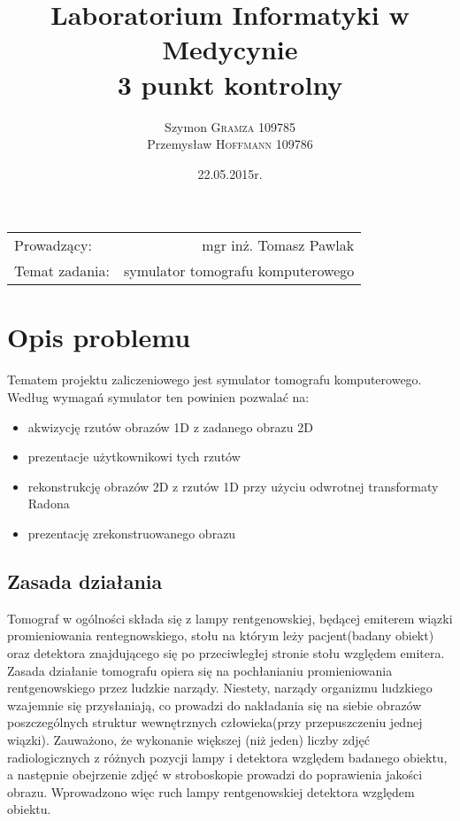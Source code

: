 \documentclass[A_4paper,12pt]{article}
\title{Laboratorium Informatyki w Medycynie \\ 3 punkt kontrolny} %
\author{Szymon \textsc{Gramza} 109785  \\ Przemysław \textsc{Hoffmann} 109786} %
\date{22.05.2015r.} %
\begin{document}
\maketitle %

\begin{center}
\begin{tabular}{l r}
Prowadzący: & mgr inż. Tomasz Pawlak \\
Temat zadania: & symulator tomografu komputerowego
\end{tabular}
\end{center}

\newpage

\section{Opis problemu}
Tematem projektu zaliczeniowego jest symulator tomografu komputerowego.
Według wymagań symulator ten powinien pozwalać na:
\begin{itemize}
\item akwizycję rzutów obrazów 1D z zadanego obrazu 2D
\item prezentacje użytkownikowi tych rzutów
\item rekonstrukcję obrazów 2D z rzutów 1D przy użyciu odwrotnej transformaty Radona
\item prezentację zrekonstruowanego obrazu
\end{itemize}

\subsection{Zasada działania}
Tomograf w ogólności składa się z lampy rentgenowskiej, będącej emiterem wiązki promieniowania rentegnowskiego, stołu na którym leży pacjent(badany obiekt) oraz  detektora znajdującego się po przeciwległej stronie stołu względem emitera.
Zasada działanie tomografu opiera się na pochłanianiu promieniowania rentgenowskiego przez ludzkie narządy.
Niestety, narządy organizmu ludzkiego wzajemnie się przysłaniają, co prowadzi do nakładania się na siebie obrazów poszczególnych struktur wewnętrznych człowieka(przy przepuszczeniu jednej wiązki).
Zauważono, że wykonanie większej (niż jeden) liczby zdjęć radiologicznych z różnych pozycji lampy i detektora względem badanego obiektu, a następnie obejrzenie zdjęć w stroboskopie prowadzi do poprawienia jakości obrazu. Wprowadzono więc ruch lampy rentgenowskiej detektora względem obiektu.
\end{document}
